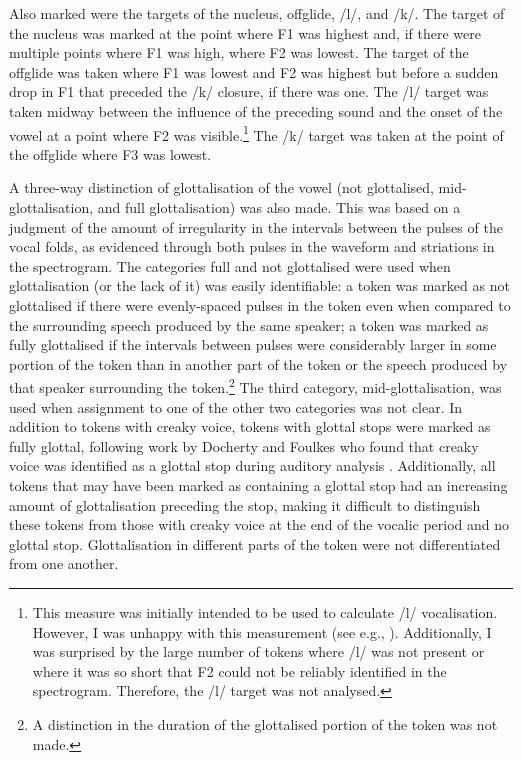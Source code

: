 \largerpage
\noindent Also marked were the targets of the nucleus, offglide, /l/, and /k/. The target of the nucleus was marked at the point where F1 was highest and, if there were multiple points where F1 was high, where F2 was lowest. The target of the offglide was taken where F1 was lowest and F2 was highest but before a sudden drop in F1 that preceded the /k/ closure, if there was one. The /l/ target was taken midway between the influence of the preceding sound and the onset of the vowel at a point where F2 was visible.\footnote{This measure was initially intended to be used to calculate /l/ vocalisation. However, I was unhappy with this measurement (see e.g., \citealt{halllewfix2012}). Additionally, I was surprised by the large number of tokens where /l/ was not present or where it was so short that F2 could not be reliably identified in the spectrogram. Therefore, the /l/ target was not analysed.} The /k/ target was taken at the point of the offglide where F3 was lowest. 

A three-way distinction of glottalisation of the vowel (not glottalised, mid-glottalisation, and full glottalisation) was also made. This was based on a judgment of the amount of irregularity in the intervals between the pulses of the vocal folds, as evidenced through both pulses in the waveform and striations in the spectrogram. The categories full and not glottalised were used when glottalisation (or the lack of it) was easily identifiable: a token was marked as not glottalised if there were evenly-spaced pulses in the token even when compared to the surrounding speech produced by the same speaker; a token was marked as fully glottalised if the intervals between pulses were considerably larger in some portion of the token than in another part of the token or the speech produced by that speaker surrounding the token.\footnote{A distinction in the duration of the glottalised portion of the token was not made.} The third category, mid-glottalisation, was used when assignment to one of the other two categories was not clear. In addition to tokens with creaky voice, tokens with glottal stops were marked as fully glottal, following work by Docherty and Foulkes who found that creaky voice was identified as a glottal stop during auditory analysis \citep{dochertyfoulkes1999}. Additionally, all tokens that may have been marked as containing a glottal stop had an increasing amount of glottalisation preceding the stop, making it difficult to distinguish these tokens from those with creaky voice at the end of the vocalic period and no glottal stop. Glottalisation in different parts of the token were not differentiated from one another.

